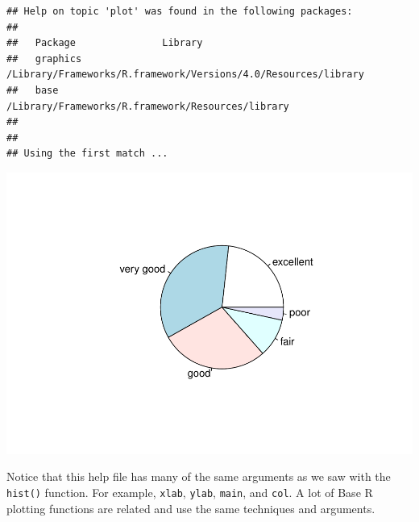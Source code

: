 \documentclass[
]{book}
\newenvironment{Shaded}{\begin{snugshade}}{\end{snugshade}}
\newcommand{\CommentTok}[1]{\textcolor[rgb]{0.56,0.35,0.01}{\textit{#1}}}
\newcommand{\DataTypeTok}[1]{\textcolor[rgb]{0.13,0.29,0.53}{#1}}
\newcommand{\KeywordTok}[1]{\textcolor[rgb]{0.13,0.29,0.53}{\textbf{#1}}}
\newcommand{\NormalTok}[1]{#1}
\newcommand{\OperatorTok}[1]{\textcolor[rgb]{0.81,0.36,0.00}{\textbf{#1}}}
\newcommand{\StringTok}[1]{\textcolor[rgb]{0.31,0.60,0.02}{#1}}
\begin{document}
\begin{verbatim}
## Help on topic 'plot' was found in the following packages:
## 
##   Package               Library
##   graphics              /Library/Frameworks/R.framework/Versions/4.0/Resources/library
##   base                  /Library/Frameworks/R.framework/Resources/library
## 
## 
## Using the first match ...
\end{verbatim}

\begin{Shaded}
\end{Shaded}

\includegraphics{_main_files/figure-latex/unnamed-chunk-136-1.pdf}

Notice that this help file has many of the same arguments as we saw with the \texttt{hist()} function. For example, \texttt{xlab}, \texttt{ylab}, \texttt{main}, and \texttt{col}. A lot of Base R plotting functions are related and use the same techniques and arguments.

\begin{Shaded}
\end{Shaded}
\end{document}
